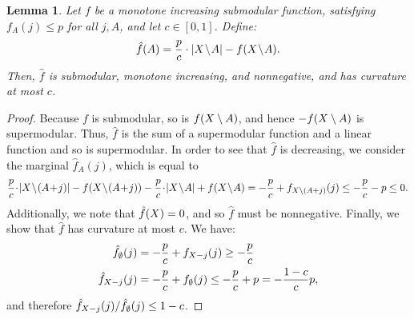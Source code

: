 \documentclass{article}
\newtheorem{lemma}[theorem]{Lemma}
\theoremstyle{definition}
\begin{document}
\begin{lemma}
\label{lem:supmod-inapprox-curv}
Let $f$ be a monotone increasing submodular function, satisfying $f_{A}(j) \le p$ for all $j, A$, and let $c \in [0,1]$.  Define:
$$\hat{f}(A) = \frac{p}{c}\cdot |X \!\setminus\! A| - f(X \!\setminus\! A).$$  Then, $\hat{f}$ is submodular, monotone increasing, and nonnegative, and has curvature at most $c$.
\end{lemma}
\begin{proof}
Because $f$ is submodular, so is $f(X \setminus A)$, and hence $-f(X \setminus A)$ is supermodular.  Thus, $\hat{f}$ is the sum of a supermodular function and a linear function and so is supermodular.  In order to see that $\hat{f}$ is decreasing, we consider the marginal $\hat{f}_{A}(j)$, which is equal to
\begin{equation*}
\frac{p}{c}\!\cdot\!|\ground\!\setminus\!(A\!+\!j)| - f(\ground\!\setminus\!(A\!+\!j)) - \frac{p}{c}\!\cdot\!|\ground\!\setminus\!A| + f(\ground\!\setminus\!A)
= -\frac{p}{c} + f_{\ground \setminus (A + j)}(j) 
\le -\frac{p}{c} - p \le 0.
\end{equation*}
Additionally, we note that $\hat{f}(X) = 0$, and so $\hat{f}$ must be nonnegative.  Finally, we show that $\hat{f}$ has curvature at most $c$.  We have:
\begin{align*}
\hat{f}_{\emptyset}(j) &= -\frac{p}{c} + f_{X - j}(j) \ge -\frac{p}{c} \\
\hat{f}_{X - j}(j) &= -\frac{p}{c} + f_{\emptyset}(j) \le -\frac{p}{c} + p = -\frac{1-c}{c}p,
\end{align*}
and therefore $\hat{f}_{X - j}(j)/\hat{f}_{\emptyset}(j) \le 1-c$.
\end{proof}
\end{document}
